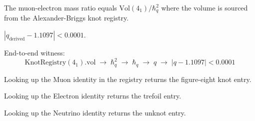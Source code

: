 \begin{theorem}
  \label{thm:skein-mass-residue}
  The muon-electron mass ratio equals
  $\mathrm{Vol}(4_1)/\hbar_q^2$ where the volume is sourced from
  the Alexander-Briggs knot registry.
\end{theorem}

\begin{theorem}
  \label{thm:substrate-error-bound}
  $|q_{\mathrm{derived}} - 1.1097| < 0.0001$.
\end{theorem}

\begin{theorem}
  \label{thm:full-derivation-chain}
  End-to-end witness:
  \[
    \mathrm{KnotRegistry}(4_1).\mathrm{vol}
      \;\longrightarrow\; \hbar_q^2
      \;\longrightarrow\; \hbar_q
      \;\longrightarrow\; q
      \;\longrightarrow\; |q - 1.1097| < 0.0001
  \]
\end{theorem}

\begin{theorem}
  \label{thm:muon-is-figure-eight}
  \leanok
  Looking up the Muon identity in the registry returns the figure-eight
  knot entry.
\end{theorem}

\begin{theorem}
  \label{thm:electron-is-trefoil}
  \leanok
  Looking up the Electron identity returns the trefoil entry.
\end{theorem}

\begin{theorem}
  \label{thm:neutrino-is-unknot}
  \leanok
  Looking up the Neutrino identity returns the unknot entry.
\end{theorem}

